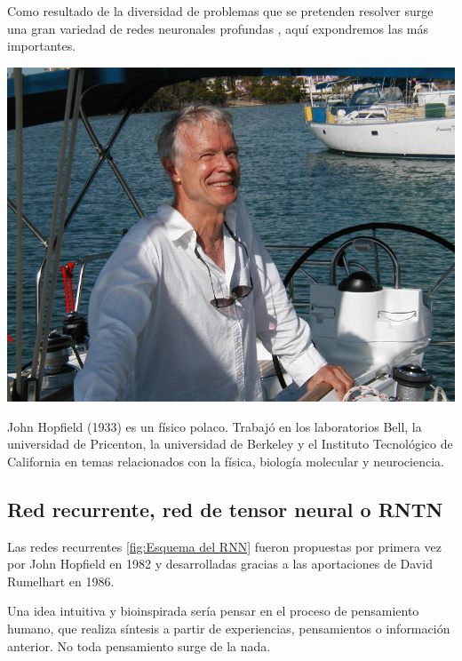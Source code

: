 \documentclass[11pt,twoside,titlepage,a4paper]{article}
\numberwithin{equation}{section} %
\theoremstyle{usual}
\begin{document}
Como resultado de la diversidad de problemas que se pretenden resolver 
surge una gran variedad de redes neuronales profundas \cite{tipos-general-redes-neuronales-profundas}, aquí expondremos las más importantes. 

\begin{marginfigure}
    \includegraphics[width=\marginparwidth]{Source/images/John_Hopfield.jpg}
    \caption{John Hopfield (1933) \cite{hopfield} es un físico polaco. Trabajó en los laboratorios Bell, la universidad de Pricenton, la universidad de Berkeley y el Instituto Tecnológico de California en temas relacionados con la física, biología molecular y neurociencia.}
    \label{fig:RegistrationComponents}
\end{marginfigure}

\subsection{Red recurrente, red de tensor neural o RNTN}

Las redes recurrentes  \ref{fig:Esquema del RNN} fueron propuestas por primera vez por John Hopfield en 1982 y desarrolladas gracias a las aportaciones de David Rumelhart en 1986.

Una idea intuitiva y bioinspirada sería pensar en el proceso de pensamiento humano, que realiza síntesis a partir de experiencias, pensamientos o información anterior. No toda pensamiento surge de la nada. 
\end{document}
